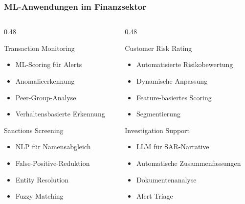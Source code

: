 \documentclass[11pt, aspectratio=169]{beamer}
\begin{document}
\begin{frame}
    \frametitle{ML-Anwendungen im Finanzsektor}
    \begin{columns}[t]
        \begin{column}{0.48\textwidth}
            \begin{block}{Transaction Monitoring}
                \begin{itemize}
                    \item ML-Scoring für Alerts
                    \item Anomalieerkennung
                    \item Peer-Group-Analyse
                    \item Verhaltensbasierte Erkennung
                \end{itemize}
            \end{block}
            \vspace{0.2cm}
            \begin{block}{Sanctions Screening}
                \begin{itemize}
                    \item NLP für Namensabgleich
                    \item False-Positive-Reduktion
                    \item Entity Resolution
                    \item Fuzzy Matching
                \end{itemize}
            \end{block}
        \end{column}
        \begin{column}{0.48\textwidth}
            \begin{block}{Customer Risk Rating}
                \begin{itemize}
                    \item Automatisierte Risikobewertung
                    \item Dynamische Anpassung
                    \item Feature-basiertes Scoring
                    \item Segmentierung
                \end{itemize}
            \end{block}
            \vspace{0.2cm}
            \begin{block}{Investigation Support}
                \begin{itemize}
                    \item LLM für SAR-Narrative
                    \item Automatische Zusammenfassungen
                    \item Dokumentenanalyse
                    \item Alert Triage
                \end{itemize}
            \end{block}
        \end{column}
    \end{columns}
\end{frame}
\end{document}

